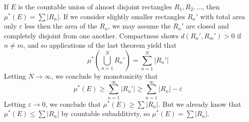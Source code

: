 \begin{example}
  If $E$ is the countable union of almost disjoint rectangles $R_1, R_2, \dots$, then $\mu^*(E) = \sum |R_n|$. If we consider slightly smaller rectangles $R_n'$ with total area only $\varepsilon$ less then the area of the $R_n$, we may assume the $R_n'$ are closed and completely disjoint from one another. Compactness shows $d(R_n',R_m') > 0$ if $n \neq m$, and so applications of the last theorem yield that
  \[ \mu^* \left( \bigcup_{n = 1}^N R_n' \right) = \sum_{n = 1}^N |R_n'| \]
  Letting $N \to \infty$, we conclude by monotonicity that
  \[ \mu^*(E) \geq \sum_{n = 1}^\infty |R_n'| \geq \sum_{n = 1}^\infty |R_n| - \varepsilon \]
  Letting $\varepsilon \to 0$, we conclude that $\mu^*(E) \geq \sum |R_n|$. But we already know that $\mu^*(E) \leq \sum |R_n|$ by countable subadditivty, so $\mu^*(E) = \sum |R_n|$.
\end{example}




